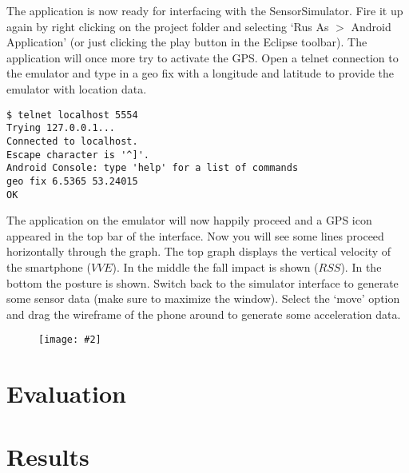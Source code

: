 \documentclass[a4paper, 10pt]{article}
\newcommand{\image}[3][\textwidth]{%
  \begin{figure}[H]%
    \centering%
    \ifthenelse{\isempty{#3}}%
      {\setlength\fboxsep{0pt}\fbox{\texttt{[image: \#2]}}}%
      {\texttt{[image: \#2]}}%
    \label{fig:{#2}}%
  \end{figure}
}
\begin{document}
The application is now ready for interfacing with the SensorSimulator. Fire it up again by right clicking on the project folder and selecting `Rus As $>$ Android Application' (or just clicking the play button in the Eclipse toolbar). The application will once more try to activate the GPS. Open a telnet connection to the emulator and type in a geo fix with a longitude and latitude to provide the emulator with location data.
\begin{lstlisting}
$ telnet localhost 5554
Trying 127.0.0.1...
Connected to localhost.
Escape character is '^]'.
Android Console: type 'help' for a list of commands
geo fix 6.5365 53.24015
OK
\end{lstlisting}
The application on the emulator will now happily proceed and a GPS icon appeared in the top bar of the interface. Now you will see some lines proceed horizontally through the graph. The top graph displays the vertical velocity of the smartphone ($VVE$). In the middle the fall impact is shown ($RSS$). In the bottom the posture is shown. Switch back to the simulator interface to generate some sensor data (make sure to maximize the window). Select the `move' option and drag the wireframe of the phone around to generate some acceleration data.
\image{simulator.png}{}





\section{Evaluation}
\section{Results}
\end{document}
